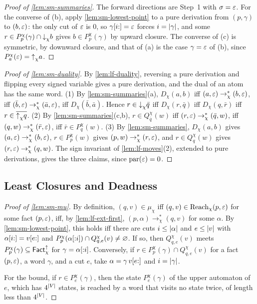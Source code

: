 \begin{proof}[Proof of \cref{lem:sm-summaries}]
The forward directions are Step~1 with $\sigma=\varepsilon$. For the converse of (b),
apply \cref{lem:sm-lowest-point} to a pure derivation from $(p,\gamma)$ to
$(b,\varepsilon)$: the only cut of $\varepsilon$ is $0$, so $\gamma[i{:}]=\varepsilon$ forces
$i=\lvert \gamma\rvert$, and some $r\in P^\chi_p(\gamma)\cap\mathord{\downarrow}_{\chi} b$ gives
$b\in P^\chi_p(\gamma)$ by upward closure. The converse of (c) is symmetric,
by downward closure, and that of (a) is the case $\gamma=\varepsilon$ of (b), since
$P^\chi_a(\varepsilon)=\mathord{\uparrow}_{\chi} a$.
\end{proof}

\begin{proof}[Proof of \cref{lem:sm-duality}]
By \cref{lem:lf-duality}, reversing a pure derivation and flipping every
signed variable gives a pure derivation, and the dual of an atom has the same
word. (1) By \cref{lem:sm-summaries}(a), $D_\chi(a,b)$ iff
$(a,\varepsilon)\to^*_\chi(b,\varepsilon)$, iff $(\bar b,\varepsilon)\to^*_\chi(\bar a,\varepsilon)$, iff
$D_\chi(\bar b,\bar a)$. Hence $r\in\mathord{\downarrow}_{\chi}{\bar q}$ iff $D_\chi(r,\bar q)$
iff $D_\chi(q,\bar r)$ iff $r\in\overline{\mathord{\uparrow}_{\chi} q}$. (2) By
\cref{lem:sm-summaries}(c,b), $r\in Q^\chi_{\bar q}(w)$ iff
$(r,\varepsilon)\to^*_\chi(\bar q,w)$, iff $(q,w)\to^*_\chi(\bar r,\varepsilon)$, iff
$\bar r\in P^\chi_q(w)$. (3) By \cref{lem:sm-summaries}, $D_\chi(a,b)$ gives
$(a,\varepsilon)\to^*_\chi(b,\varepsilon)$, $r\in P^\chi_p(w)$ gives
$(p,w)\to^*_\chi(r,\varepsilon)$, and $r\in Q^\chi_q(w)$ gives
$(r,\varepsilon)\to^*_\chi(q,w)$. The sign invariant of \cref{lem:lf-moves}(2),
extended to pure derivations, gives the three claims, since
$\operatorname{par}(\varepsilon)=0$.
\end{proof}

\subsection{Least Closures and Deadness}\label{app:sm-dead}

\begin{proof}[Proof of \cref{lem:sm-mu}]
By definition, $(q,v)\in\mu_\chi$ iff $(q,v)\in\operatorname{Reach}_\chi(p,\varepsilon)$ for some
fact $(p,\varepsilon)$, iff, by \cref{lem:lf-ext-first},
$(p,\alpha)\to^*_\chi(q,v)$ for some $\alpha$. By \cref{lem:sm-lowest-point},
this holds iff there are cuts $i\le\lvert \alpha\rvert$ and $e\le\lvert v\rvert$ with
$\alpha[i{:}]=v[e{:}]$ and
$P^\chi_p(\alpha[{:}i])\cap Q^\chi_{q,e}(v)\ne\varnothing$. If so, then
$Q^\chi_{q,e}(v)$ meets $P^\chi_p(\gamma)\subseteq\mathsf{Fact}^{\uparrow}_{\chi}$ for
$\gamma=\alpha[{:}i]$. Conversely, if $r\in P^\chi_p(\gamma)\cap Q^\chi_{q,e}(v)$
for a fact $(p,\varepsilon)$, a word $\gamma$, and a cut $e$, take
$\alpha=\gamma\,v[e{:}]$ and $i=\lvert \gamma\rvert$.

For the bound, if $r\in P^\chi_e(\gamma)$, then the state $P^\chi_e(\gamma)$ of
the upper automaton of $e$, which has $4^{\lvert V\rvert}$ states, is reached by a word
that visits no state twice, of length less than $4^{\lvert V\rvert}$.
\end{proof}

